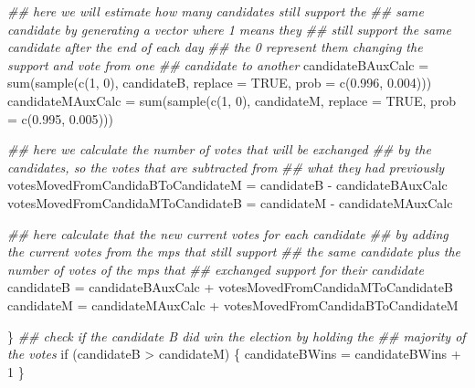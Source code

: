 \documentclass[
  a4paper,
  DIV=11,
  numbers=noendperiod]{scrartcl}
\newenvironment{Shaded}{\begin{snugshade}}{\end{snugshade}}
\newcommand{\AttributeTok}[1]{\textcolor[rgb]{0.40,0.45,0.13}{#1}}
\newcommand{\ConstantTok}[1]{\textcolor[rgb]{0.56,0.35,0.01}{#1}}
\newcommand{\ControlFlowTok}[1]{\textcolor[rgb]{0.00,0.23,0.31}{#1}}
\newcommand{\DecValTok}[1]{\textcolor[rgb]{0.68,0.00,0.00}{#1}}
\newcommand{\DocumentationTok}[1]{\textcolor[rgb]{0.37,0.37,0.37}{\textit{#1}}}
\newcommand{\FloatTok}[1]{\textcolor[rgb]{0.68,0.00,0.00}{#1}}
\newcommand{\FunctionTok}[1]{\textcolor[rgb]{0.28,0.35,0.67}{#1}}
\newcommand{\NormalTok}[1]{\textcolor[rgb]{0.00,0.23,0.31}{#1}}
\newcommand{\OtherTok}[1]{\textcolor[rgb]{0.00,0.23,0.31}{#1}}
\newcommand{\SpecialCharTok}[1]{\textcolor[rgb]{0.37,0.37,0.37}{#1}}
\begin{document}
\begin{Shaded}
\begin{Highlighting}[]
        \DocumentationTok{\#\# here we will estimate how many candidates still support the}
        \DocumentationTok{\#\# same candidate by generating a vector where 1 means they}
        \DocumentationTok{\#\# still support the same candidate after the end of each day}
        \DocumentationTok{\#\# the 0 represent them changing the support and vote from one}
        \DocumentationTok{\#\# candidate to another}
\NormalTok{        candidateBAuxCalc }\OtherTok{=} \FunctionTok{sum}\NormalTok{(}\FunctionTok{sample}\NormalTok{(}\FunctionTok{c}\NormalTok{(}\DecValTok{1}\NormalTok{, }\DecValTok{0}\NormalTok{), candidateB, }\AttributeTok{replace =} \ConstantTok{TRUE}\NormalTok{,}
            \AttributeTok{prob =} \FunctionTok{c}\NormalTok{(}\FloatTok{0.996}\NormalTok{, }\FloatTok{0.004}\NormalTok{)))}
\NormalTok{        candidateMAuxCalc }\OtherTok{=} \FunctionTok{sum}\NormalTok{(}\FunctionTok{sample}\NormalTok{(}\FunctionTok{c}\NormalTok{(}\DecValTok{1}\NormalTok{, }\DecValTok{0}\NormalTok{), candidateM, }\AttributeTok{replace =} \ConstantTok{TRUE}\NormalTok{,}
            \AttributeTok{prob =} \FunctionTok{c}\NormalTok{(}\FloatTok{0.995}\NormalTok{, }\FloatTok{0.005}\NormalTok{)))}

        \DocumentationTok{\#\# here we calculate the number of votes that will be exchanged}
        \DocumentationTok{\#\# by the candidates, so the votes that are subtracted from}
        \DocumentationTok{\#\# what they had previously}
\NormalTok{        votesMovedFromCandidaBToCandidateM }\OtherTok{=}\NormalTok{ candidateB }\SpecialCharTok{{-}}\NormalTok{ candidateBAuxCalc}
\NormalTok{        votesMovedFromCandidaMToCandidateB }\OtherTok{=}\NormalTok{ candidateM }\SpecialCharTok{{-}}\NormalTok{ candidateMAuxCalc}

        \DocumentationTok{\#\# here calculate that the new current votes for each candidate}
        \DocumentationTok{\#\# by adding the current votes from the mps that still support}
        \DocumentationTok{\#\# the same candidate plus the number of votes of the mps that}
        \DocumentationTok{\#\# exchanged support for their candidate}
\NormalTok{        candidateB }\OtherTok{=}\NormalTok{ candidateBAuxCalc }\SpecialCharTok{+}\NormalTok{ votesMovedFromCandidaMToCandidateB}
\NormalTok{        candidateM }\OtherTok{=}\NormalTok{ candidateMAuxCalc }\SpecialCharTok{+}\NormalTok{ votesMovedFromCandidaBToCandidateM}

\NormalTok{    \}}
    \DocumentationTok{\#\# check if the candidate B did win the election by holding the}
    \DocumentationTok{\#\# majority of the votes}
    \ControlFlowTok{if}\NormalTok{ (candidateB }\SpecialCharTok{\textgreater{}}\NormalTok{ candidateM) \{}
\NormalTok{        candidateBWins }\OtherTok{=}\NormalTok{ candidateBWins }\SpecialCharTok{+} \DecValTok{1}
\NormalTok{    \}}


\end{Highlighting}
\end{Shaded}
\end{document}
